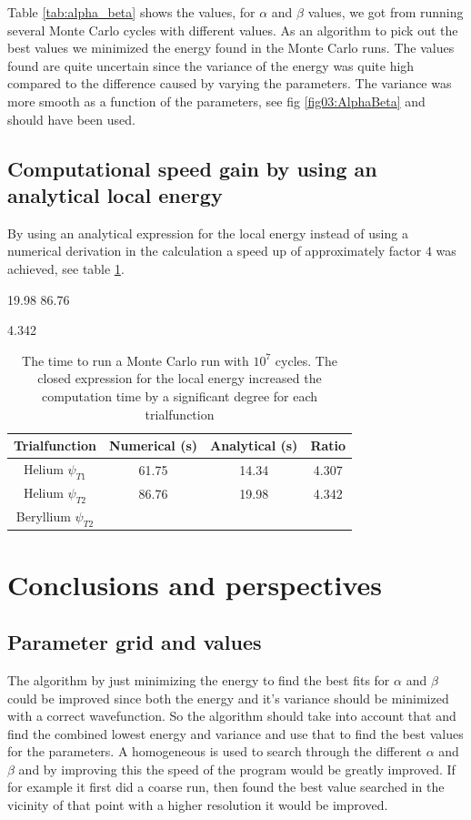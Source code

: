 \documentclass[11pt]{article}
\begin{document}
	Table \ref{tab:alpha_beta} shows the values, for \(\alpha\) and \(\beta\) values, we got from  running several Monte Carlo cycles with different values. As an algorithm to pick out the best values we minimized the energy found in the Monte Carlo runs. The values found are quite uncertain since the variance of the energy was quite high compared to the difference caused by varying the parameters. The variance was more smooth as a function of the parameters, see fig \ref{fig03:AlphaBeta} and should have been used.


	\subsection{Computational speed gain by using an analytical local energy}
	By using an analytical expression for the local energy instead of using a numerical derivation in the calculation a speed up of approximately factor \(4\) was achieved, see table \ref{tab:analyticVSNumeric}. 

19.98
86.76

4.342

	\begin{table}
\center
		\begin{tabular}{| c | c | c | c |}
		    \hline
		   	\textbf{Trialfunction} & Numerical (s) & Analytical (s) & Ratio
		    \\ \hline
		    Helium $\psi_{T1}$ & 61.75 & 14.34 & 4.307
		    \\ \hline 
		    Helium $\psi_{T2}$ & 86.76 & 19.98	& 4.342
		    \\	\hline 
		    Beryllium $\psi_{T2}$	& &	 &
 		    \\ \hline
	  \end{tabular}
	  \caption{The time to run a Monte Carlo run with \(10^7\) cycles. The closed expression for the local energy increased the computation time by a significant degree for each trialfunction }
	  \label{tab:analyticVSNumeric}
\end{table}

\section{Conclusions and perspectives}

	\subsection{Parameter grid  and values }
		The algorithm by just minimizing the energy to find the best fits for \(\alpha\) and \(\beta\) could be improved since both the energy and it's variance should be minimized with a correct wavefunction. So the algorithm should take into account that and find the combined lowest energy and variance and use that to find the best values for the parameters. A homogeneous is used to search through the different \(\alpha\) and \(\beta\) and by improving this the speed of the program would be greatly improved. If for example it first did a coarse run, then found the best value searched in the vicinity of that point with a higher resolution it would be improved.
\end{document}
